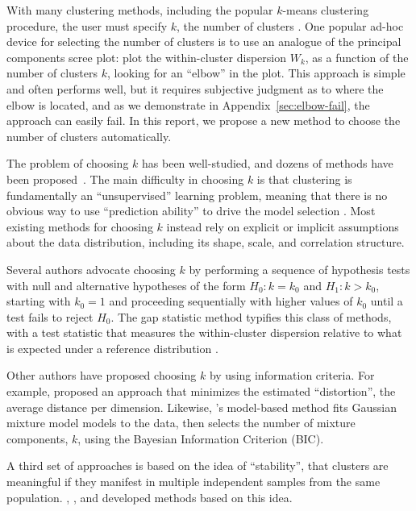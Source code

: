 \documentclass[12pt]{article}
\begin{document}
With many clustering methods, including the popular $k$-means clustering
procedure, the user must specify $k$, the number of clusters
\citep{jain2010data}.  One popular ad-hoc device for selecting the number of
clusters is to use an analogue of the principal components scree plot: plot
the within-cluster dispersion $W_k$, as a function of the number of clusters
$k$, looking for an ``elbow'' in the plot.  This approach is simple and often
performs well, but it requires subjective judgment as to where the elbow is
located, and as we demonstrate in Appendix~\ref{sec:elbow-fail}, the approach
can easily fail.  In this report, we propose a new method to choose the number
of clusters automatically.


The problem of choosing $k$ has been well-studied, and dozens of methods have
been proposed~\citep{chiang2010intelligent,fujita2014non}. The main difficulty
in choosing $k$ is that clustering is fundamentally an ``unsupervised''
learning problem, meaning that there is no obvious way to use ``prediction
ability'' to drive the model selection \citep{hastie2009elements}.  Most
existing methods for choosing $k$ instead rely on explicit or implicit
assumptions about the data distribution, including its shape, scale, and
correlation structure.


Several authors advocate choosing $k$ by performing a sequence of hypothesis
tests with null and alternative hypotheses of the form $H_0 : k = k_0$ and
$H_1: k > k_0$, starting with $k_0 = 1$ and proceeding sequentially with
higher values of $k_0$ until a test fails to reject $H_0$. The gap statistic
method typifies this class of methods, with a test statistic that measures the
within-cluster dispersion relative to what is expected under a reference
distribution \citep{tibshirani2001estimating}.


Other authors have proposed choosing $k$ by using information
criteria.  For example, \citet{sugar2003finding} proposed an approach that
minimizes the estimated ``distortion'', the average distance per dimension.
Likewise, \citet{fraley2002model}'s model-based method fits Gaussian mixture model
models to the data, then selects the number of mixture components, $k$, using
the Bayesian Information Criterion (BIC).


A third set of approaches is based on the idea of ``stability'', that clusters
are meaningful if they manifest in multiple independent samples from the same
population. \citet{ben2001stability}, \citet{tibshirani2005cluster},
\citet{wang2010consistent} and \citet{fang2012selection} developed methods
based on this idea.
\end{document}
